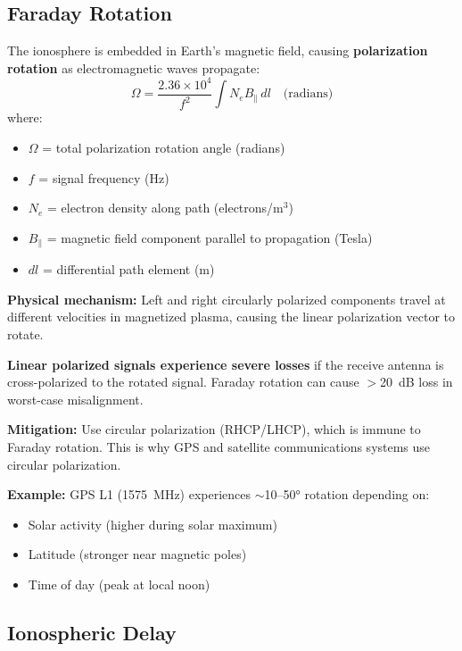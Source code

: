 \subsection{Faraday Rotation}

The ionosphere is embedded in Earth's magnetic field, causing \textbf{polarization rotation} as electromagnetic waves propagate:
\begin{equation}
\Omega = \frac{2.36 \times 10^4}{f^2} \int N_e B_\parallel \, dl \quad \text{(radians)}
\end{equation}
where:
\begin{itemize}
\item $\Omega$ = total polarization rotation angle (radians)
\item $f$ = signal frequency (Hz)
\item $N_e$ = electron density along path (electrons/m$^3$)
\item $B_\parallel$ = magnetic field component parallel to propagation (Tesla)
\item $dl$ = differential path element (m)
\end{itemize}

\textbf{Physical mechanism:} Left and right circularly polarized components travel at different velocities in magnetized plasma, causing the linear polarization vector to rotate.

\begin{warningbox}
\textbf{Linear polarized signals experience severe losses} if the receive antenna is cross-polarized to the rotated signal. Faraday rotation can cause $>$20~dB loss in worst-case misalignment.

\textbf{Mitigation:} Use circular polarization (RHCP/LHCP), which is immune to Faraday rotation. This is why GPS and satellite communications systems use circular polarization.
\end{warningbox}

\textbf{Example:} GPS L1 (1575~MHz) experiences $\sim$10--50$°$ rotation depending on:
\begin{itemize}
\item Solar activity (higher during solar maximum)
\item Latitude (stronger near magnetic poles)
\item Time of day (peak at local noon)
\end{itemize}



\subsection{Ionospheric Delay}


